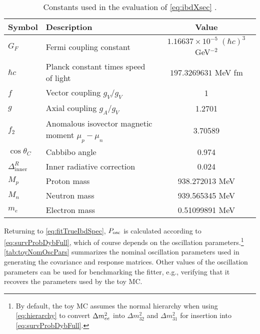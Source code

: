 \documentclass[../thesis.tex]{subfiles}
\begin{document}
\begin{table}[ht]
  \begin{tabular}{llc}
    \toprule
    Symbol & Description & Value \\
    \midrule
    $G_F$ & Fermi coupling constant & $1.16637 \times 10^{-5}\; (\hbar c)^3$ GeV$^{-2}$ \\
    $\hbar c$ & Planck constant times speed of light & $197.3269631$ MeV fm \\
    $f$ & Vector coupling $g_V/g_V$ & 1 \\
    $g$ & Axial coupling $g_A/g_V$ & 1.2701 \\
    $f_2$ & Anomalous isovector magnetic moment $\mu_p - \mu_n$ & 3.70589 \\
    $\cos \theta_C$ & Cabbibo angle & 0.974 \\
    $\Delta^R_{\mathrm{inner}}$ & Inner radiative correction \cite{doi:10.1063/1.59543} & 0.024 \\
    $M_p$ & Proton mass & 938.272013 MeV \\
    $M_n$ & Neutron mass & 939.565345 MeV \\
    $m_e$ & Electron mass & 0.51099891 MeV \\
    \bottomrule
  \end{tabular}
  \caption{Constants used in the evaluation of \autoref{eq:ibdXsec} \cite{pdg2011}.}
  \label{tab:xsecConstants}
\end{table}

Returning to \autoref{eq:fitTrueIbdSpec}, $P_\mathrm{osc}$ is calculated according to \autoref{eq:survProbDybFull}, which of course depends on the oscillation parameters.\footnote{By default, the toy MC assumes the normal hierarchy when using \autoref{eq:hierarchy} to convert $\Delta m^2_{ee}$ into $\Delta m^2_{32}$ and $\Delta m^2_{31}$ for insertion into \autoref{eq:survProbDybFull}.} \autoref{tab:toyNomOscPars} summarizes the nominal oscillation parameters used in generating the covariance and response matrices.
Other values of the oscillation parameters can be used for benchmarking the fitter, e.g., verifying that it recovers the parameters used by the toy MC.
\end{document}
